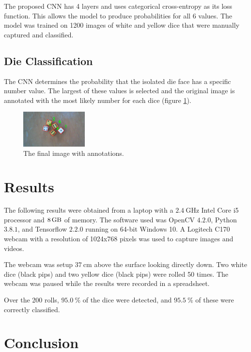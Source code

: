 \documentclass[conference]{IEEEtran}
\begin{document}
The proposed CNN has 4 layers and uses categorical cross-entropy as its loss function. 
This allows the model to produce probabilities for all 6 values.
The model was trained on 1200 images of white and yellow dice that were manually captured and classified.

\subsection{Die Classification}

The CNN determines the probability that the isolated die face has a specific number value.
The largest of these values is selected and the original image is annotated with the most likely number for each dice (figure \ref{fig:annotated}).
\begin{figure}
	\centering
	\includegraphics[width=0.3\textwidth]{annotated}
	\caption{The final image with annotations.}
	\label{fig:annotated}
\end{figure}

\section{Results}

The following results were obtained from a laptop with a $\SI{2.4}{\giga\hertz}$ Intel Core i5 processor and $\SI{8}{\giga\byte}$ of memory.
The software used was OpenCV $4.2.0$, Python $3.8.1$, and Tensorflow $2.2.0$ running on 64-bit Windows 10.
A Logitech C170 webcam with a resolution of 1024x768 pixels was used to capture images and videos.

The webcam was setup $\SI{37}{\centi\metre}$ above the surface looking directly down. 
Two white dice (black pips) and two yellow dice (black pips) were rolled 50 times.
The webcam was paused while the results were recorded in a spreadsheet.

Over the 200 rolls, $\SI{95.0}{\percent}$ of the dice were detected, and $\SI{95.5}{\percent}$ of these were correctly classified.

\section{Conclusion}
\end{document}
